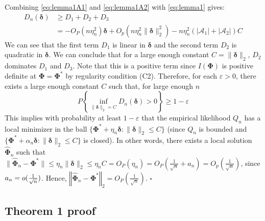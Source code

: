 \documentclass[a4paper,fleqn]{cas-sc}
\newcommand{\Op}{O_{P}}
\newcommand{\bdelta}{\boldsymbol{\delta}}
\newcommand{\A}{\mathcal{A}}
\begin{document}
{	Combining \eqref{eq:lemma1A1} and \eqref{eq:lemma1A2} with \eqref{eq:lemma1}
	gives: 
	\[
	\begin{aligned}D_{n}(\boldsymbol{\delta}) & \geq D_{1}+D_{2}+D_{3}\\
	& =-\Op\left(n\eta_{n}^{2}\right)\boldsymbol{\delta}+O_{p}(n\eta_{n}^{2}\|\bdelta\|_{2}^{2})-n\eta_{n}^{2}(|\A_{1}|+|\A_{2}|)C
	\end{aligned}
	\]
	We can see that the first term $D_{1}$ is linear in $\bdelta$ and
	the second term $D_{2}$ is quadratic in $\bdelta$. We can conclude
	that for a large enough constant $C=\|\bdelta\|_{2}$, $D_{2}$ dominates
	$D_{1}$ and $D_{3}$. Note that this is a positive term since $I(\boldsymbol{\Phi})$
	is positive definite at $\boldsymbol{\Phi}=\boldsymbol{\Phi}^{*}$
	by regularity condition (C2). Therefore, for each $\varepsilon>0$,
	there exists a large enough constant $C$ such that, for large enough
	$n$ 
	\[
	P\left\{ \underset{\|\bdelta\|_{2}=C}{\inf}D_{n}\left(\boldsymbol{\delta}\right)>0\right\} \geq1-\varepsilon
	\]
	This implies with probability at least $1-\varepsilon$ that the empirical
	likelihood $Q_{n}$ has a local minimizer in the ball $\{\boldsymbol{\Phi}^{*}+\eta_{n}\mathbf{\bdelta}:\|\mathbf{\bdelta}\|_{2}\leq C\}$
	(since $Q_{n}$ is bounded and $\{\boldsymbol{\Phi}^{*}+\alpha_{n}\bdelta:\|\bdelta\|_{2}\leq C\}$
	is closed). In other words, there exists a local solution $\widehat{\boldsymbol{\Phi}}_{n}$
	such that $\|\widehat{\boldsymbol{\Phi}}_{n}-\boldsymbol{\Phi}^{*}\|\leq\eta_{n}\|\bdelta\|_{2}\leq\eta_{n}C=\Op(\eta_{n})=\Op(\frac{1}{\sqrt{n}}+a_{n})=O_{p}(\frac{1}{\sqrt{n}})$,
	since $a_{n}=o(\text{\ensuremath{\frac{1}{\sqrt{n}}}})$. Hence, $\left\Vert \widehat{\boldsymbol{\Phi}}_{n}-\boldsymbol{\Phi}^{*}\right\Vert _{2}=\Op\left(\frac{1}{\sqrt{n}}\right).$
	$\square$}{\normalsize\par}


\subsection{Theorem 1 proof}
\end{document}
